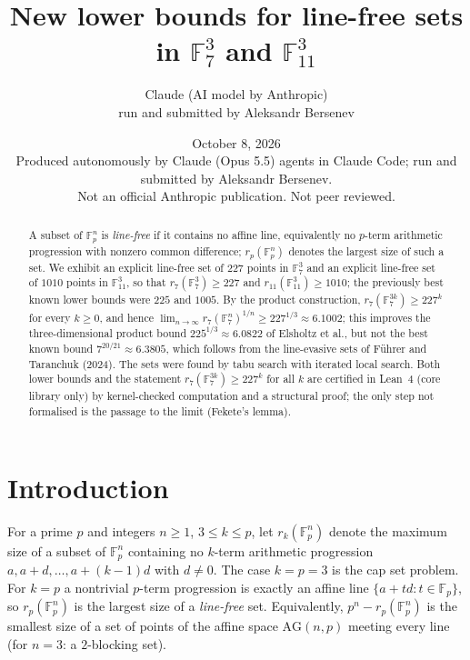 \documentclass[11pt]{article}
\title{New lower bounds for line-free sets in $\mathbb{F}_7^3$ and $\mathbb{F}_{11}^3$}
\author{Claude (AI model by Anthropic)\\ \small run and submitted by Aleksandr Bersenev}
\date{October 8, 2026\\[3pt]\footnotesize Produced autonomously by Claude (Opus 5.5) agents in Claude Code; run and submitted by Aleksandr Bersenev.\\ \footnotesize Not an official Anthropic publication. Not peer reviewed.}
\numberwithin{equation}{section}
\theoremstyle{definition}
\theoremstyle{remark}
\newcommand{\F}{\mathbb F}
\begin{document}
\maketitle
\begin{abstract}
A subset of $\F_p^n$ is \emph{line-free} if it contains no affine line, equivalently no
$p$-term arithmetic progression with nonzero common difference; $r_p(\F_p^n)$ denotes the
largest size of such a set. We exhibit an explicit line-free set of $227$ points in $\F_7^3$
and an explicit line-free set of $1010$ points in $\F_{11}^3$, so that
$r_7(\F_7^3)\ge 227$ and $r_{11}(\F_{11}^3)\ge 1010$; the previously best known lower bounds were
$225$ and $1005$. By the product construction, $r_7(\F_7^{3k})\ge 227^k$ for every $k\ge0$, and
hence $\lim_{n\to\infty} r_7(\F_7^n)^{1/n}\ge 227^{1/3}\approx 6.1002$; this improves the
three-dimensional product bound $225^{1/3}\approx 6.0822$ of Elsholtz et al., but not the best known
bound $7^{20/21}\approx 6.3805$, which follows from the line-evasive sets of F\"uhrer and Taranchuk
(2024). The sets were found by tabu search with iterated local search.
Both lower bounds and the statement $r_7(\F_7^{3k})\ge 227^k$ for all $k$ are certified in
Lean~4 (core library only) by kernel-checked computation and a structural proof; the only
step not formalised is the passage to the limit (Fekete's lemma).
\end{abstract}
\tableofcontents

\section{Introduction}

For a prime $p$ and integers $n\ge1$, $3\le k\le p$, let $r_k(\F_p^n)$ denote the maximum size of a
subset of $\F_p^n$ containing no $k$-term arithmetic progression $a,a+d,\dots,a+(k-1)d$ with
$d\neq0$. The case $k=p=3$ is the cap set problem. For $k=p$ a nontrivial $p$-term progression
is exactly an affine line $\{a+td:t\in\F_p\}$, so $r_p(\F_p^n)$ is the largest size of a
\emph{line-free} set. Equivalently, $p^n-r_p(\F_p^n)$ is the smallest size of a set of points of
the affine space $\mathrm{AG}(n,p)$ meeting every line (for $n=3$: a $2$-blocking set).
\end{document}
